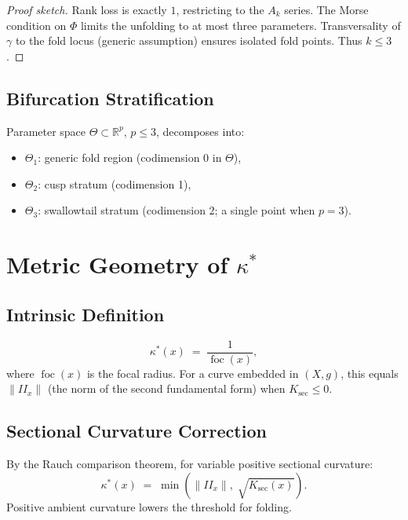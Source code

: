 \documentclass[12pt, oneside]{book}
\theoremstyle{plain}
\theoremstyle{definition}
\theoremstyle{remark}
\begin{document}
\begin{proof}[Proof sketch]
Rank loss is exactly $1$, restricting to the $A_k$ series. The Morse
condition on $\Phi$ limits the unfolding to at most three parameters.
Transversality of $\gamma$ to the fold locus (generic assumption)
ensures isolated fold points. Thus $k \le 3$.
\end{proof}

\subsection{Bifurcation Stratification}

Parameter space $\Theta \subset \mathbb{R}^p$, $p \le 3$, decomposes
into:
\begin{itemize}
\item $\Theta_1$: generic fold region (codimension 0 in $\Theta$),
\item $\Theta_2$: cusp stratum (codimension 1),
\item $\Theta_3$: swallowtail stratum
  (codimension 2; a single point when $p=3$).
\end{itemize}

\section{Metric Geometry of \texorpdfstring{$\kappa^*$}{kappa*}}
\label{sec:metric}

\subsection{Intrinsic Definition}

\[
\kappa^*(x) \;=\; \frac{1}{\operatorname{foc}(x)},
\]
where $\operatorname{foc}(x)$ is the focal radius. For a curve
embedded in $(X,g)$, this equals $\|II_x\|$ (the norm of the second
fundamental form) when $K_{\mathrm{sec}} \le 0$.

\subsection{Sectional Curvature Correction}

By the Rauch comparison theorem, for variable positive sectional
curvature:
\[
\kappa^*(x) \;=\; \min\!\left(\|II_x\|,\;
  \sqrt{K_{\mathrm{sec}}(x)}\right).
\]
Positive ambient curvature lowers the threshold for folding.
\end{document}

